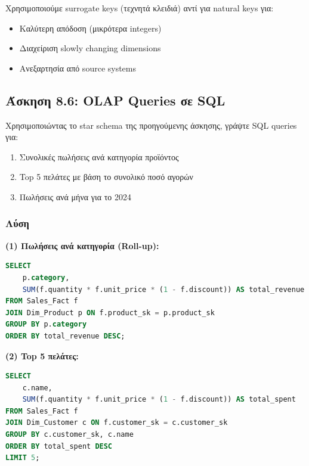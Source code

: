 \begin{infobox}
Χρησιμοποιούμε surrogate keys (τεχνητά κλειδιά) αντί για natural keys για:
\begin{itemize}
    \item Καλύτερη απόδοση (μικρότερα integers)
    \item Διαχείριση slowly changing dimensions
    \item Ανεξαρτησία από source systems
\end{itemize}
\end{infobox}

\subsection{Άσκηση 8.6: OLAP Queries σε SQL}

\begin{formulabox}[Εκφώνηση]
Χρησιμοποιώντας το star schema της προηγούμενης άσκησης, γράψτε SQL queries για:

\begin{enumerate}
    \item Συνολικές πωλήσεις ανά κατηγορία προϊόντος
    \item Top 5 πελάτες με βάση το συνολικό ποσό αγορών
    \item Πωλήσεις ανά μήνα για το 2024
\end{enumerate}
\end{formulabox}

\subsubsection*{Λύση}

\textbf{(1) Πωλήσεις ανά κατηγορία (Roll-up):}

\begin{lstlisting}[language=SQL]
SELECT
    p.category,
    SUM(f.quantity * f.unit_price * (1 - f.discount)) AS total_revenue
FROM Sales_Fact f
JOIN Dim_Product p ON f.product_sk = p.product_sk
GROUP BY p.category
ORDER BY total_revenue DESC;
\end{lstlisting}

\textbf{(2) Top 5 πελάτες:}

\begin{lstlisting}[language=SQL]
SELECT
    c.name,
    SUM(f.quantity * f.unit_price * (1 - f.discount)) AS total_spent
FROM Sales_Fact f
JOIN Dim_Customer c ON f.customer_sk = c.customer_sk
GROUP BY c.customer_sk, c.name
ORDER BY total_spent DESC
LIMIT 5;
\end{lstlisting}


